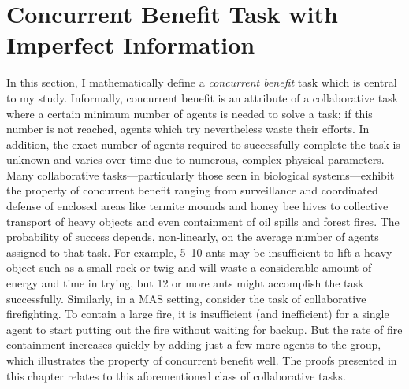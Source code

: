 \documentclass[defaultstyle,12pt]{proposal}
\begin{document}
\section{Concurrent Benefit Task with Imperfect Information}\label{sec:conbenefit}
In this section, I mathematically define a \emph{concurrent benefit} task which is central to my study. Informally, concurrent benefit is an attribute of a collaborative task where a certain minimum number of agents is needed to solve a task; if this number is not reached, agents which try nevertheless waste their efforts. In addition, the exact number of agents required to successfully complete the task is unknown and varies over time due to numerous, complex physical parameters. Many collaborative tasks---particularly those seen in biological systems---exhibit the property of concurrent benefit ranging from surveillance and coordinated defense of enclosed areas like termite mounds and honey bee hives \cite{Breed1990} to collective transport of heavy objects and even containment of oil spills and forest fires. The probability of success depends, non-linearly, on the average number of agents assigned to that task. For example, 5--10 ants may be insufficient to lift a heavy object such as a small rock or twig and will waste a considerable amount of energy and time in trying, but 12 or more ants might accomplish the task successfully. Similarly, in a MAS setting, consider the task of collaborative firefighting. To contain a large fire, it is insufficient (and inefficient) for a single agent to start putting out the fire without waiting for backup. But the rate of fire containment increases quickly by adding just a few more agents to the group, which illustrates the property of concurrent benefit well. The proofs presented in this chapter relates to this aforementioned class of collaborative tasks.
\end{document}
